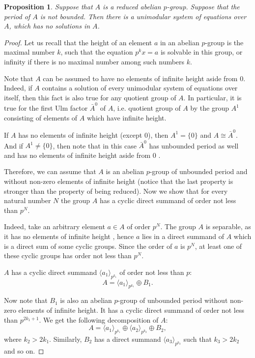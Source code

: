 \documentclass{article}
\newtheorem{prop}{Proposition}
\theoremstyle{definition}
\theoremstyle{remark}
\begin{document}
\begin{prop}\label{pbad}
Suppose that $A$ is a reduced abelian $p$-group.
Suppose that the period of $A$ is not bounded.
Then there is a unimodular system of equations over $A$,
which has no solutions in $A$.
\end{prop}
\begin{proof}
Let us recall that the height of an element $a$
in an abelian $p$-group is the maximal number $k$,
such that the equation $p^kx=a$
is solvable in this group, or infinity if there is no maximal number
among such numbers $k$.

Note that $A$ can be assumed to have no
elements of infinite height aside from $0$.
Indeed, if $A$ contains a solution of every unimodular system of equations
over itself, then this fact is also true for any quotient group of $A$.
In particular, it is true for the first Ulm factor $\bar A^0$ of $A$,
i.e. quotient group of $A$ by the group $A^1$
consisting of elements of $A$ which have infinite height.

If $A$ has no elements of infinite height (except $0$),
then $A^1=\{0\}$ and $A \cong \bar A^0$.
And if $A^1\neq \{0\}$, then note that in this case
$\bar A^0$ has unbounded period as well
and has no elements of infinite height aside from $0$ \cite[\S 27]{Kurosh67}.

Therefore, we can assume that
$A$ is an abelian $p$-group of unbounded period
and without non-zero elements of infinite height
(notice that the last property is stronger than the property of being reduced).
Now we show that for every natural number $N$
the group $A$ has a cyclic direct summand of order not less than $p^N$.

Indeed, take an arbitrary element
$a\in A$ of order $p^N$.
The group $A$ is separable, as it has no elements of infinite height
\cite[\S 65]{Fuchs73},
hence $a$ lies in a direct summand of
$A$ which is a direct sum of some cyclic groups.
Since the order of $a$ is $p^N$,
at least one of these cyclic groups has order not less than $p^N$.

$A$ has a cyclic direct summand
$\langle a_1 \rangle_{p^{k_1}}$
of order not less than $p$:
$$
A = \langle a_1 \rangle_{p^{k_1}} \oplus B_1.
$$

Now note that $B_1$ is also an abelian
$p$-group of unbounded period
without non-zero elements of infinite height.
It has a cyclic direct summand of order not less than $p^{2k_1+1}$.
We get the following decomposition of $A$:
$$
A = \langle a_1 \rangle_{p^{k_1}} \oplus \langle a_2 \rangle_{p^{k_2}} \oplus B_2,
$$
where $k_2 > 2k_1$. Similarly,
$B_2$ has a direct summand $\langle a_3 \rangle_{p^{k_3}}$
such that $k_3 > 2k_2$
and so on.


\end{proof}
\end{document}
